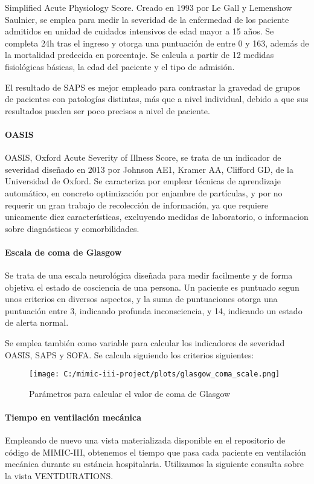 \documentclass{report}
\begin{document}
Simplified Acute Physiology Score. Creado en 1993 por Le Gall y
Lemenshow Saulnier, se emplea para medir la severidad de la enfermedad
de los paciente admitidos en unidad de cuidados intensivos de edad mayor
a 15 años. Se completa 24h tras el ingreso y otorga una puntuación de
entre 0 y 163, además de la mortalidad predecida en porcentaje. Se
calcula a partir de 12 medidas fisiológicas básicas, la edad del
paciente y el tipo de admisión.

El resultado de SAPS es mejor empleado para contrastar la gravedad de
grupos de pacientes con patologías distintas, más que a nivel
individual, debido a que sus resultados pueden ser poco precisos a nivel
de paciente.

\paragraph{OASIS}

OASIS, Oxford Acute Severity of Illness Score, se trata de un indicador
de severidad diseñado en 2013 por Johnson AE1, Kramer AA, Clifford GD,
de la Universidad de Oxford. Se caracteriza por emplear técnicas de
aprendizaje automático, en concreto optimización por enjambre de
partículas, y por no requerir un gran trabajo de recolección de
información, ya que requiere unicamente diez características, excluyendo
medidas de laboratorio, o informacion sobre diagnósticos y
comorbilidades.

\paragraph{Escala de coma de Glasgow}

Se trata de una escala neurológica diseñada para medir facilmente y de
forma objetiva el estado de cosciencia de una persona. Un paciente es
puntuado segun unos criterios en diversos aspectos, y la suma de
puntuaciones otorga una puntuación entre 3, indicando profunda
inconsciencia, y 14, indicando un estado de alerta normal.

Se emplea también como variable para calcular los indicadores de
severidad OASIS, SAPS y SOFA. Se calcula siguiendo los criterios
siguientes:

\begin{figure}[h]
\centering
\texttt{[image: C:/mimic-iii-project/plots/glasgow\_coma\_scale.png]}
\caption{Parámetros para calcular el valor de coma de Glasgow}
\end{figure}

\paragraph{Tiempo en ventilación mecánica}
Empleando de nuevo una vista materializada disponible en el repositorio
de código de MIMIC-III, obtenemos el tiempo que pasa cada paciente en
ventilación mecánica durante su estáncia hospitalaria. Utilizamos la
siguiente consulta sobre la vista VENTDURATIONS.
\end{document}
